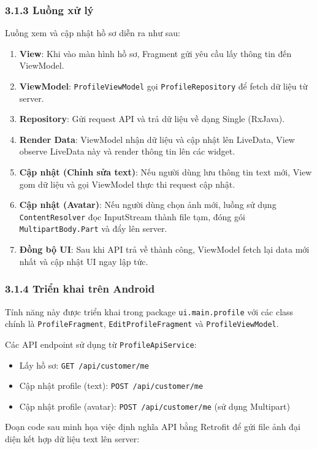 \subsubsection*{3.1.3 Luồng xử lý}
Luồng xem và cập nhật hồ sơ diễn ra như sau:
\begin{enumerate}
    \item \textbf{View}: Khi vào màn hình hồ sơ, Fragment gửi yêu cầu lấy thông tin đến ViewModel.
    \item \textbf{ViewModel}: \texttt{ProfileViewModel} gọi \texttt{ProfileRepository} để fetch dữ liệu từ server.
    \item \textbf{Repository}: Gửi request API và trả dữ liệu về dạng Single (RxJava).
    \item \textbf{Render Data}: ViewModel nhận dữ liệu và cập nhật lên LiveData, View observe LiveData này và render thông tin lên các widget.
    \item \textbf{Cập nhật (Chỉnh sửa text)}: Nếu người dùng lưu thông tin text mới, View gom dữ liệu và gọi ViewModel thực thi request cập nhật.
    \item \textbf{Cập nhật (Avatar)}: Nếu người dùng chọn ảnh mới, luồng sử dụng \texttt{ContentResolver} đọc InputStream thành file tạm, đóng gói \texttt{MultipartBody.Part} và đẩy lên server.
    \item \textbf{Đồng bộ UI}: Sau khi API trả về thành công, ViewModel fetch lại data mới nhất và cập nhật UI ngay lập tức.
\end{enumerate}

\subsubsection*{3.1.4 Triển khai trên Android}
Tính năng này được triển khai trong package \texttt{ui.main.profile} với các class chính là \texttt{ProfileFragment}, \texttt{EditProfileFragment} và \texttt{ProfileViewModel}.

Các API endpoint sử dụng từ \texttt{ProfileApiService}:
\begin{itemize}
    \item Lấy hồ sơ: \texttt{GET /api/customer/me}
    \item Cập nhật profile (text): \texttt{POST /api/customer/me}
    \item Cập nhật profile (avatar): \texttt{POST /api/customer/me} (sử dụng Multipart)
\end{itemize}

Đoạn code sau minh họa việc định nghĩa API bằng Retrofit để gửi file ảnh đại diện kết hợp dữ liệu text lên server:

